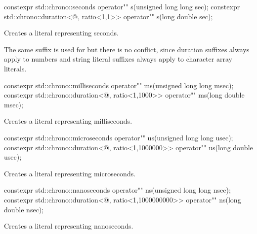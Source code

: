 \documentclass[ebook,11pt,article]{memoir}
\begin{document}
\begin{itemdecl}
constexpr 
std::chrono::seconds operator"" s(unsigned long long sec);
constexpr 
std::chrono::duration<@\seebelow@, ratio<1,1>> operator"" s(long double sec);
\end{itemdecl}

\begin{itemdescr}
\pnum
\effects
Creates a  literal representing  seconds.

\enternote
The same suffix  is used for  but there is no conflict, since duration suffixes always apply to numbers and string literal suffixes always apply to character array literals.
\exitnote
\end{itemdescr}

\begin{itemdecl}
constexpr 
std::chrono::milliseconds operator"" ms(unsigned long long msec);
constexpr 
std::chrono::duration<@\seebelow@, ratio<1,1000>> operator"" ms(long double msec);
\end{itemdecl}

\begin{itemdescr}
\pnum
\effects
Creates a  literal representing  milliseconds.
\end{itemdescr}

\begin{itemdecl}
constexpr 
std::chrono::microseconds operator"" us(unsigned long long usec);
constexpr 
std::chrono::duration<@\seebelow@, ratio<1,1000000>> operator"" us(long double usec);
\end{itemdecl}

\begin{itemdescr}
\pnum
\effects
Creates a  literal representing  microseconds.
\end{itemdescr}

\begin{itemdecl}
constexpr 
std::chrono::nanoseconds operator"" ns(unsigned long long nsec);
constexpr 
std::chrono::duration<@\seebelow@, ratio<1,1000000000>> operator"" ns(long double nsec);
\end{itemdecl}

\begin{itemdescr}
\pnum
\effects
Creates a  literal representing  nanoseconds.
\end{itemdescr}
\end{document}

